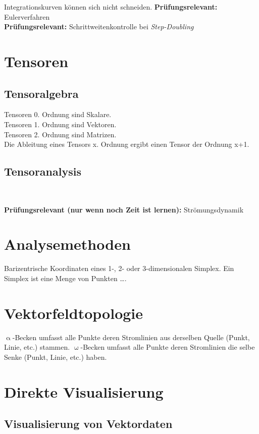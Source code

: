 \documentclass[12pt,a4paper,oneside,normalheadings,abstracton,liststotoc,bibtotoc,titlepage,pdftex]{scrbook}
\begin{document}
Integrationskurven können sich nicht schneiden.
\textbf{Prüfungsrelevant:} Eulerverfahren\\
\textbf{Prüfungsrelevant:} Schrittweitenkontrolle bei \textit{Step-Doubling}\\



\section{Tensoren}
\subsection{Tensoralgebra}
Tensoren 0. Ordnung sind Skalare.\\
Tensoren 1. Ordnung sind Vektoren.\\
Tensoren 2. Ordnung sind Matrizen.\\
Die Ableitung eines Tensors x. Ordnung ergibt einen Tensor der Ordnung x+1. 
\subsection{Tensoranalysis}

\


\textbf{Prüfungsrelevant (nur wenn noch Zeit ist lernen):} Strömungsdynamik\\

\section{Analysemethoden}
Barizentrische Koordinaten eines 1-, 2- oder 3-dimensionalen Simplex. Ein Simplex ist eine Menge von Punkten \dots . 



\section{Vektorfeldtopologie}
$\upalpha$-Becken umfasst alle Punkte deren Stromlinien aus derselben Quelle (Punkt, Linie, etc.) stammen. $\upomega$-Becken umfasst alle Punkte deren Stromlinien die selbe Senke (Punkt, Linie, etc.) haben.

\section{Direkte Visualisierung}
\subsection{Visualisierung von Vektordaten}
\end{document}
